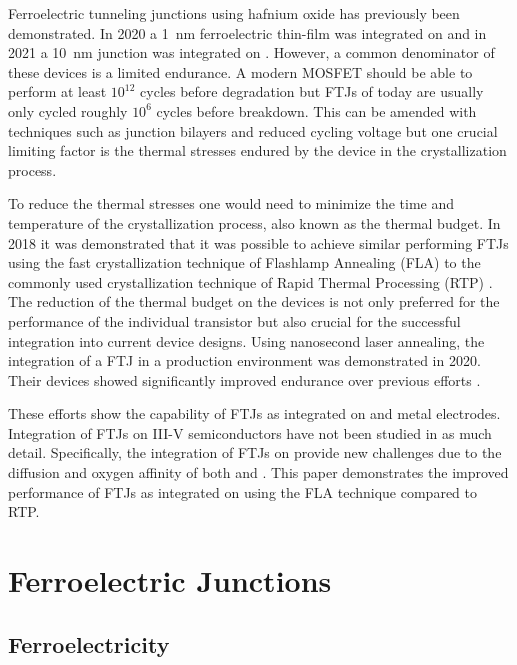 \documentclass[11pt,twoside,final]{eitExjobb}  %
\begin{document}
Ferroelectric tunneling junctions using hafnium oxide has previously been
demonstrated. In 2020 a \SI{1}{\nano\meter} ferroelectric thin-film was
integrated on  and in 2021 a \SI{10}{\nano\meter} junction was
integrated on  \cite{cheema2020one, athle2021effects}. However, a
common denominator of these devices is a limited endurance. A modern MOSFET
should be able to perform at least $10^{12}$ cycles before degradation but FTJs
of today are usually only cycled roughly $10^6$ cycles before breakdown. This
can be amended with techniques such as junction bilayers and reduced cycling
voltage but one crucial limiting factor is the thermal stresses endured by the
device in the crystallization process.

To reduce the thermal stresses one would need to minimize the time and
temperature of the crystallization process, also known as the thermal budget.
In 2018 it was demonstrated that it was possible to achieve similar performing
FTJs using the fast crystallization technique of Flashlamp Annealing (FLA) to
the commonly used crystallization technique of Rapid Thermal Processing (RTP) 
\cite{oconnor2018stabilization}. The reduction of the thermal budget on the
devices is not only preferred for the performance of the individual transistor
but also crucial for the successful integration into current device designs.
Using nanosecond laser annealing, the integration of a FTJ in a production
environment was demonstrated in 2020. Their devices showed significantly
improved endurance over previous efforts \cite{grenouillet2020nanosecond}.

These efforts show the capability of FTJs as integrated on  and metal
electrodes. Integration of FTJs on III-V semiconductors have not been studied
in as much detail. Specifically, the integration of FTJs on  provide
new challenges due to the diffusion and oxygen affinity of both  and
 \cite{kang2016structural}. This paper demonstrates the improved
performance of FTJs as integrated on  using the FLA technique compared
to RTP.
    
\chapter{Ferroelectric Junctions}\label{ch:ferro}

\section{Ferroelectricity}\label{sec:ferro}
\end{document}
